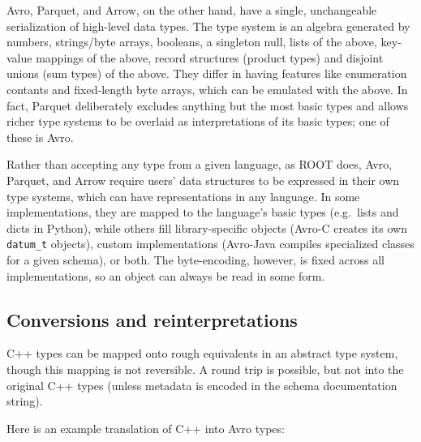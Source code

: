 \documentclass{article}
\begin{document}
Avro, Parquet, and Arrow, on the other hand, have a single, unchangeable serialization of high-level data types. The type system is an algebra generated by numbers, strings/byte arrays, booleans, a singleton null, lists of the above, key-value mappings of the above, record structures (product types) and disjoint unions (sum types) of the above. They differ in having features like enumeration contants and fixed-length byte arrays, which can be emulated with the above. In fact, Parquet deliberately excludes anything but the most basic types and allows richer type systems to be overlaid as interpretations of its basic types; one of these is Avro.

Rather than accepting any type from a given language, as ROOT does, Avro, Parquet, and Arrow require users' data structures to be expressed in their own type systems, which can have representations in any language. In some implementations, they are mapped to the language's basic types (e.g.\ lists and dicts in Python), while others fill library-specific objects (Avro-C creates its own {\tt datum\_t} objects), custom implementations (Avro-Java compiles specialized classes for a given schema), or both. The byte-encoding, however, is fixed across all implementations, so an object can always be read in some form.

\subsection*{Conversions and reinterpretations}

C++ types can be mapped onto rough equivalents in an abstract type system, though this mapping is not reversible. A round trip is possible, but not into the original C++ types (unless metadata is encoded in the schema documentation string).

Here is an example translation of C++ into Avro types:
\end{document}
